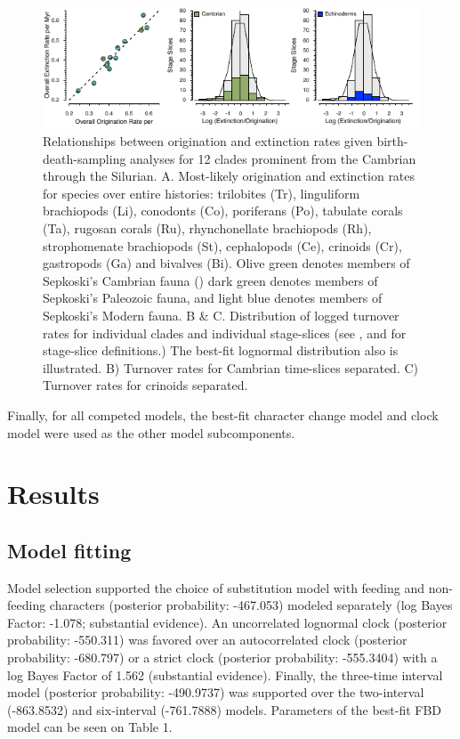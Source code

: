 \documentclass{article}
\begin{document}
\begin{figure}
  \includegraphics[width=\textwidth]{figures/Turnover PaleoStyle.pdf}

  \caption{Relationships between origination and extinction rates given birth-death-sampling analyses for 12 clades prominent from the Cambrian through the Silurian.  A. Most-likely origination and extinction rates for species over entire histories: trilobites (Tr), linguliform brachiopods (Li), conodonts (Co), poriferans (Po), tabulate corals (Ta), rugosan corals (Ru), rhynchonellate brachiopods (Rh), strophomenate brachiopods (St), cephalopods (Ce), crinoids (Cr), gastropods (Ga) and bivalves (Bi). Olive green denotes members of Sepkoski's Cambrian fauna (\citep{Sepkoski1981}) dark green denotes members of Sepkoski's Paleozoic fauna, and light blue denotes members of Sepkoski's Modern fauna. B & C. Distribution of logged turnover rates for individual clades and individual stage-slices (see \citep{Bergström2009}, \citep{Cramer2011} and \citep{Rasmussen2019} for stage-slice definitions.)  The best-fit lognormal distribution also is illustrated.  B) Turnover rates for Cambrian time-slices separated.  C) Turnover rates for crinoids separated.}
\end{figure}

Finally, for all competed models, the best-fit character change model and clock model were used as the other model subcomponents.

\section{Results}

\subsection{Model fitting}

Model selection supported the choice of substitution model with feeding and non-feeding characters (posterior probability: -467.053) modeled separately (log Bayes Factor: -1.078; substantial evidence).
An uncorrelated lognormal clock (posterior probability: -550.311) was favored over an autocorrelated clock (posterior probability: -680.797) or a strict clock (posterior probability: -555.3404) with a log Bayes Factor of 1.562 (substantial evidence).
Finally, the three-time interval model (posterior probability: -490.9737) was supported over the two-interval (-863.8532) and six-interval (-761.7888) models. 
Parameters of the best-fit FBD model can be seen on Table 1.
\end{document}
